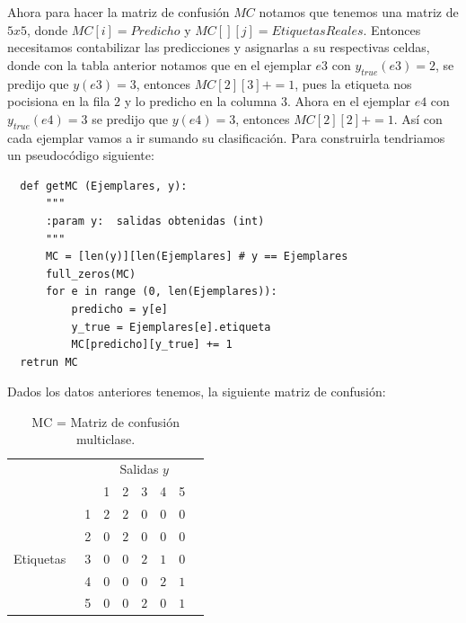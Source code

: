 \begin{description}
\begin{example}
\begin{center}
\begin{tabular}{c|ccccccccccccccc}
\end{tabular}
\end{center}
\end{example}

 Ahora para hacer la matriz de confusión $MC$ notamos que tenemos una matriz de $5 x 5$, donde $MC[i]= Predicho$ y $MC[][j] = EtiquetasReales$. Entonces necesitamos contabilizar las predicciones y asignarlas a su respectivas celdas, donde con la tabla anterior notamos que en el ejemplar $e3$ con $y_{true}(e3)= 2$, se predijo que $y(e3)=3$, entonces $MC[2][3] +=1$, pues la etiqueta nos pocisiona en la fila $2$ y lo predicho en la columna $3$. Ahora en el ejemplar $e4$ con $y_{true}(e4)= 3$ se predijo que $y(e4)= 3$, entonces  $MC[2][2] +=1$. Así con cada ejemplar vamos a ir sumando su clasificación. Para construirla tendriamos un pseudocódigo siguiente:
 \begin{verbatim}
  def getMC (Ejemplares, y):
      """
      :param y:  salidas obtenidas (int)
      """
      MC = [len(y)][len(Ejemplares] # y == Ejemplares
      full_zeros(MC)
      for e in range (0, len(Ejemplares)):
          predicho = y[e]
          y_true = Ejemplares[e].etiqueta
          MC[predicho][y_true] += 1
  retrun MC
 \end{verbatim}

Dados los datos anteriores tenemos, la siguiente matriz de confusión: 
 \begin{table}[H]
\begin{center}
\begin{tabular}{|c|c|c|c|c|c|c|c|}
\cline{3-8}
\multicolumn{2}{c|}{} & \multicolumn{5}{c|}{Salidas $y$} \\
\cline{3-8}
\multicolumn{2}{c|}{} & 1 & 2 & 3 & 4 & 5 \\
\hline
\multirow{5}{*}{\begin{sideways} Etiquetas~ \end{sideways}} & 1 & $2$ & $2$ & $0$ & $0$ & $0$ \\
\cline{2-8}
& 2 & $0$ & $2$  & $0$ & $0$ & $0$ \\
\cline{2-8}
& 3 & $0$ & $0$  & $2$ & $1$ & $0$ \\
\cline{2-8}
& 4 & $0$ & $0$  & $0$ & $2$ & $1$ \\
\cline{2-8}
& 5 & $0$ & $0$  & $2$ & $0$ & $1$ \\
\hline
\end{tabular}
\end{center}
\caption{MC = Matriz de confusión multiclase.}
\label{Table2}
\end{table}


\end{description}
